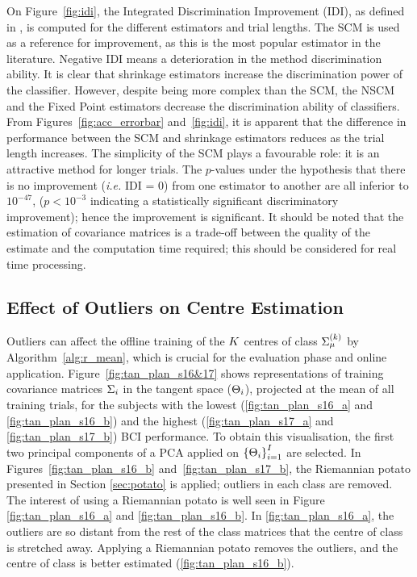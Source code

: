 On Figure~\ref{fig:idi}, the Integrated Discrimination Improvement (IDI), as defined in \cite{pencina_evaluating_2008}, is computed for the different estimators and trial lengths. 
The SCM is used as a reference for improvement, as this is the most popular estimator in the literature. 
Negative IDI means a deterioration in the method discrimination ability. 
It is clear that shrinkage estimators increase the discrimination power of the classifier. 
However, despite being more complex than the SCM, the NSCM and the Fixed Point estimators decrease the discrimination ability of classifiers.     
From Figures~\ref{fig:acc_errorbar} and~\ref{fig:idi}, it is apparent that the difference in performance between the SCM and shrinkage estimators reduces as the trial length increases.
The simplicity of the SCM plays a favourable role: it is an attractive method for longer trials. 
The $p$-values under the hypothesis that there is no improvement (\textit{i.e.} IDI = 0) from one estimator to another are all inferior to $10^{-47}$, ($p<10^{-3}$ indicating a statistically significant discriminatory improvement); hence the improvement is significant.
It should be noted that the estimation of covariance matrices is a trade-off between the quality of the estimate and the computation time required; this should be considered for real time processing.
    
\subsection{Effect of Outliers on Centre Estimation}

Outliers can affect the offline training of the $K$ centres of class $\Sigma_{\mu}^{(k)}$ by Algorithm~\ref{alg:r_mean}, which is crucial for the evaluation phase and online application.
Figure~\ref{fig:tan_plan_s16&17} shows representations of training covariance matrices $\Sigma_{i}$ in the tangent space ($\Theta_{i}$), projected at the mean of all training trials, for the subjects with the lowest (\ref{fig:tan_plan_s16_a} and \ref{fig:tan_plan_s16_b}) and the highest (\ref{fig:tan_plan_s17_a} and \ref{fig:tan_plan_s17_b}) BCI performance. 
To obtain this visualisation, the first two principal components of a PCA applied on $\left\{ \Theta_{i} \right\}_{i=1}^{I}$ are selected.
In Figures~\ref{fig:tan_plan_s16_b} and~\ref{fig:tan_plan_s17_b}, the Riemannian potato presented in Section \ref{sec:potato} is applied; outliers in each class are removed.
The interest of using a Riemannian potato is well seen in Figure \ref{fig:tan_plan_s16_a} and \ref{fig:tan_plan_s16_b}. 
In \ref{fig:tan_plan_s16_a}, the outliers are so distant from the rest of the class matrices that the centre of class is stretched away.
Applying a Riemannian potato removes the outliers, and the centre of class is better estimated (\ref{fig:tan_plan_s16_b}).

